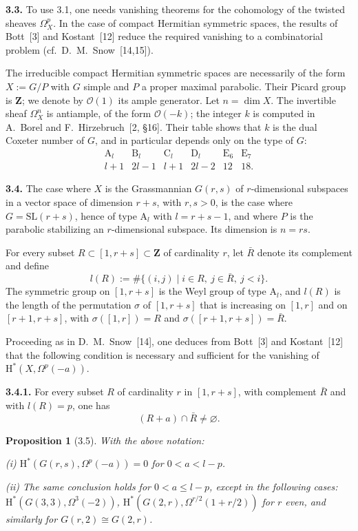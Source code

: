 \documentclass[11pt]{amsart}
\newtheorem{proposition}[theorem]{Proposition}
\theoremstyle{definition}
\begin{document}
\medskip
\noindent\textbf{3.3.} To use 3.1, one needs vanishing theorems for the cohomology of the twisted sheaves $\Omega_X^p$. In the case of compact Hermitian symmetric spaces, the results of Bott~[3] and Kostant~[12] reduce the required vanishing to a combinatorial problem (cf.~D.~M.~Snow~[14,15]).

The irreducible compact Hermitian symmetric spaces are necessarily of the form $X:=G/P$ with $G$ simple and $P$ a proper maximal parabolic. Their Picard group is $\mathbf Z$; we denote by $\mathscr O(1)$ its ample generator. Let $n=\dim X$. The invertible sheaf $\Omega_X^n$ is antiample, of the form $\mathscr O(-k)$; the integer $k$ is computed in A.~Borel and F.~Hirzebruch~[2, \S16]. Their table shows that $k$ is the dual Coxeter number of $G$, and in particular depends only on the type of $G$:
\[
\begin{array}{ccccccc}
\mathrm A_l & \mathrm B_l & \mathrm C_l & \mathrm D_l & \mathrm E_6 & \mathrm E_7\\
l+1 & 2l-1 & l+1 & 2l-2 & 12 & 18.
\end{array}
\]

\noindent\textbf{3.4.} The case where $X$ is the Grassmannian $G(r,s)$ of $r$-dimensional subspaces in a vector space of dimension $r+s$, with $r,s>0$, is the case where $G=\mathrm{SL}(r+s)$, hence of type $\mathrm A_l$ with $l=r+s-1$, and where $P$ is the parabolic stabilizing an $r$-dimensional subspace. Its dimension is $n=rs$.

For every subset $R\subset [1,r+s]\subset \mathbf Z$ of cardinality $r$, let $\bar R$ denote its complement and define
\[
l(R):=\#\{(i,j)\mid i\in R,\ j\in \bar R,\ j<i\}.
\]
The symmetric group on $[1,r+s]$ is the Weyl group of type $\mathrm A_l$, and $l(R)$ is the length of the permutation $\sigma$ of $[1,r+s]$ that is increasing on $[1,r]$ and on $[r+1,r+s]$, with $\sigma([1,r])=R$ and $\sigma([r+1,r+s])=\bar R$.

Proceeding as in D.~M.~Snow~[14], one deduces from Bott~[3] and Kostant~[12] that the following condition is necessary and sufficient for the vanishing of $\mathrm H^*(X,\Omega^p(-a))$.

\medskip
\noindent\textbf{3.4.1.} For every subset $R$ of cardinality $r$ in $[1,r+s]$, with complement $\bar R$ and with $l(R)=p$, one has
\[
(R+a)\cap \bar R \neq \varnothing.
\]

\begin{proposition}[3.5]
With the above notation:

\emph{(i)} $\mathrm H^*(G(r,s),\Omega^p(-a))=0$ for $0<a<l-p$.

\emph{(ii)} The same conclusion holds for $0<a\le l-p$, except in the following cases: $\mathrm H^*(G(3,3),\Omega^3(-2))$, $\mathrm H^*(G(2,r),\Omega^{r/2}(1+r/2))$ for $r$ even, and similarly for $G(r,2)\cong G(2,r)$.
\end{proposition}
\end{document}
